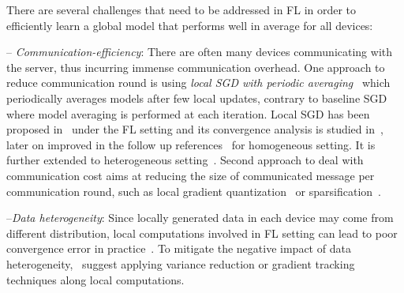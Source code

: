 \documentclass{article}
\begin{document}
There are several challenges that need to be addressed in FL in order to efficiently learn a global model that performs well in average for all devices:

-- \emph{Communication-efficiency}: There are often many devices communicating with the server, thus incurring immense communication overhead. 
One approach to reduce communication round is using \emph{local SGD with periodic averaging}~\citep{zhou2018convergence,stich2019local,yu2019parallel,wang2018cooperative} which periodically averages models after few local updates, contrary to baseline SGD~\citep{bottou-bousquet-2008} where model averaging is performed at each iteration.
Local SGD has been proposed in~\citet{mcmahan2016communication,konevcny2016federated} under the FL setting and its convergence analysis is studied in~\citet{stich2019local,wang2018cooperative,zhou2018convergence,yu2019parallel}, later on improved in the follow up references~\citep{basu2019qsparse,haddadpour2019convergence,bayoumi2020tighter,stich2019error} for homogeneous setting. 
It is further extended to heterogeneous setting~\citep{yu2019linear,li2019convergence,sahu2018convergence,liang2019variance,haddadpour2019convergence,karimireddy2019scaffold}. Second approach to deal with communication cost aims at reducing the size of communicated message per communication round, such as local gradient quantization~\citep{alistarh2017qsgd,bernstein2018signsgd,tang2018communication,wen2017terngrad,wu2018error} or sparsification~\citep{alistarh2018convergence,lin2017deep,stich2018sparsified,stich2019error}. 


--\emph{Data heterogeneity}: 
Since locally generated data in each device may come from different distribution, local computations involved in FL setting can lead to poor convergence error in practice~\citep{li2019federated,liang2019variance}. 
To mitigate the negative impact of data heterogeneity,~\citep{haddadpour2020federated,horvath2019stochastic,liang2019variance,karimireddy2019scaffold} suggest applying variance reduction or gradient tracking techniques along local computations.
\end{document}
